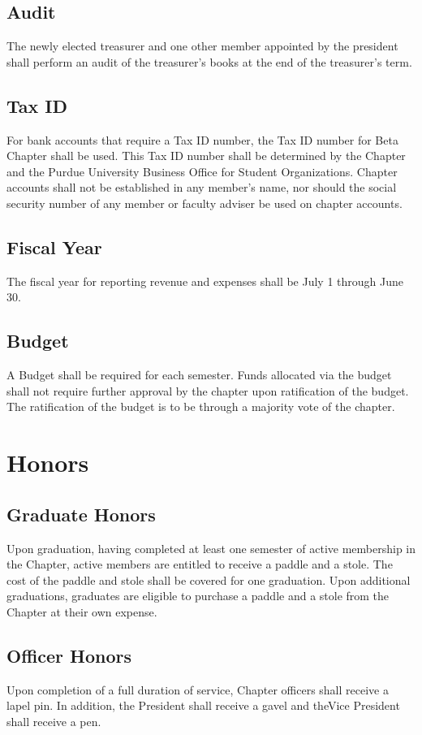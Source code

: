 \documentclass[10pt, oneside]{article}
\begin{document}
\subsection{Audit}
The newly elected treasurer and one other member appointed by the president shall perform an audit of the treasurer’s books at the end of the treasurer’s term.
\subsection{Tax ID}
For bank accounts that require a Tax ID number, the Tax ID number for Beta Chapter shall be used. This Tax ID number shall be determined by the Chapter and the Purdue University Business Office for Student Organizations. Chapter accounts shall not be established in any member’s name, nor should the social security number of any member or faculty adviser be used on chapter accounts.
\subsection{Fiscal Year}
The fiscal year for reporting revenue and expenses shall be July 1 through June 30.
\subsection{Budget}
A Budget shall be required for each semester. Funds allocated via the budget shall not require further approval by the chapter upon ratification of the budget. The ratification of the budget is to be through a majority vote of the chapter.

\section{Honors}
\subsection{Graduate Honors}
Upon graduation, having completed at least one semester of active membership in the Chapter, active members are entitled to receive a paddle and a stole. The cost of the paddle and stole shall be covered for one graduation. Upon additional graduations, graduates are eligible to purchase a paddle and a stole from the Chapter at their own expense.
\subsection{Officer Honors}
Upon completion of a full duration of service, Chapter officers shall receive a lapel pin. In addition, the President shall receive a gavel and theVice President shall receive a pen.
\end{document}
